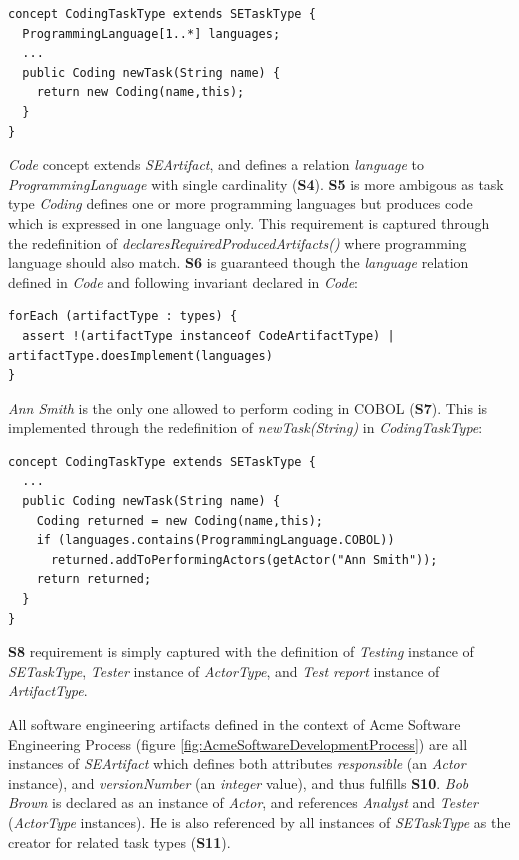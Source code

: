 \begin{lstlisting}
concept CodingTaskType extends SETaskType {
  ProgrammingLanguage[1..*] languages;
  ...
  public Coding newTask(String name) { 
    return new Coding(name,this); 
  }
}    
\end{lstlisting}

\textit{Code} concept extends \textit{SEArtifact}, and defines a relation \textit{language} to \textit{ProgrammingLanguage} with single cardinality (\textbf{S4}). \textbf{S5} is more ambigous as task type \textit{Coding} defines one or more programming languages but produces code which is expressed in one language only. This requirement is captured through the redefinition of \textit{declaresRequiredProducedArtifacts()} where programming language should also match. 
\textbf{S6} is guaranteed though the \textit{language} relation defined in \textit{Code} and following invariant declared in \textit{Code}:  

\begin{lstlisting}
forEach (artifactType : types) {
  assert !(artifactType instanceof CodeArtifactType) | artifactType.doesImplement(languages)
}
\end{lstlisting}

\textit{Ann Smith} is the only one allowed to perform coding in COBOL (\textbf{S7}). This is implemented through the redefinition of \textit{newTask(String)} in \textit{CodingTaskType}:

\begin{lstlisting}
concept CodingTaskType extends SETaskType {
  ...
  public Coding newTask(String name) {
    Coding returned = new Coding(name,this); 
    if (languages.contains(ProgrammingLanguage.COBOL))
      returned.addToPerformingActors(getActor("Ann Smith"));
    return returned;
  }
}    
\end{lstlisting}

\textbf{S8} requirement is simply captured with the definition of \textit{Testing} instance of \textit{SETaskType}, \textit{Tester} instance of \textit{ActorType}, and \textit{Test report} instance of \textit{ArtifactType}.



All software engineering artifacts defined in the context of Acme Software Engineering Process (figure \ref{fig:AcmeSoftwareDevelopmentProcess}) are all instances of \textit{SEArtifact} which defines both attributes \textit{responsible} (an \textit{Actor} instance), and \textit{versionNumber} (an \textit{integer} value), and thus fulfills \textbf{S10}. \textit{Bob Brown} is declared as an instance of \textit{Actor}, and references \textit{Analyst} and \textit{Tester} (\textit{ActorType} instances). He is also referenced by all instances of \textit{SETaskType} as the creator for related task types (\textbf{S11}).

